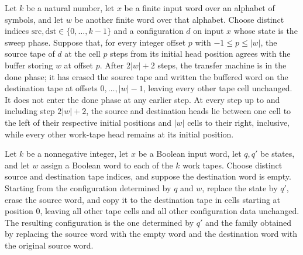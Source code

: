 \begin{theorem}
\label{Turing.transferTM_run_ofCfg}
\leanok
{}
Let $k$ be a natural number, let $x$ be a finite input word over an alphabet of symbols,
and let $w$ be another finite word over that alphabet. Choose distinct indices
$\mathrm{src},\mathrm{dst}\in\{0,\ldots,k-1\}$ and a configuration $d$ on input $x$
whose state is the sweep phase. Suppose that, for every integer offset $p$ with $-1\le
p\le |w|$, the source tape of $d$ at the cell $p$ steps from its initial head position
agrees with the buffer storing $w$ at offset $p$. After $2|w|+2$ steps, the transfer
machine is in the done phase; it has erased the source tape and written the buffered
word on the destination tape at offsets $0,\ldots,|w|-1$, leaving every other tape cell
unchanged. It does not enter the done phase at any earlier step. At every step up to and
including step $2|w|+2$, the source and destination heads lie between one cell to the
left of their respective initial positions and $|w|$ cells to their right, inclusive,
while every other work-tape head remains at its initial position.
\end{theorem}

\begin{theorem}
\label{Turing.Cfg.ofWords_transfer_endpoint}
\leanok
{}
Let $k$ be a nonnegative integer, let $x$ be a Boolean input word, let $q,q'$ be states,
and let $w$ assign a Boolean word to each of the $k$ work tapes. Choose distinct source
and destination tape indices, and suppose the destination word is empty. Starting from
the configuration determined by $q$ and $w$, replace the state by $q'$, erase the source
word, and copy it to the destination tape in cells starting at position $0$, leaving all
other tape cells and all other configuration data unchanged. The resulting configuration
is the one determined by $q'$ and the family obtained by replacing the source word with
the empty word and the destination word with the original source word.
\end{theorem}

